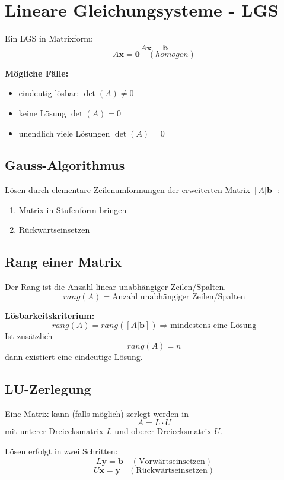 \documentclass[9pt,a4paper]{article}
\begin{document}
    \section{Lineare Gleichungsysteme - LGS}
    
    Ein LGS in Matrixform:
    \[
    A\mathbf{x}=\mathbf{b}
    \]
    \[
    A\mathbf{x}=\mathbf{0} \quad (homogen)
    \]
    
    \textbf{Mögliche Fälle:}
    \begin{itemize}
        \item eindeutig lösbar: $\det(A)\neq 0$
        \item keine Lösung  $\det(A) = 0$
        \item unendlich viele Lösungen  $\det(A)= 0$
    \end{itemize}
    
    \subsection{Gauss-Algorithmus}
    Lösen durch elementare Zeilenumformungen der erweiterten Matrix $[A|\mathbf{b}]$:
    \begin{enumerate}
        \item Matrix in Stufenform bringen
        \item Rückwärtseinsetzen
    \end{enumerate}
    
    \subsection{Rang einer Matrix}
    Der Rang ist die Anzahl linear unabhängiger Zeilen/Spalten.
    \[
    rang(A)=\text{Anzahl unabhängiger Zeilen/Spalten}
    \]
    
    \textbf{Lösbarkeitskriterium:}
    \[
    rang(A)=rang([A|\mathbf{b}]) \Rightarrow \text{mindestens eine Lösung}
    \]
    Ist zusätzlich
    \[
    rang(A)=n
    \]
    dann existiert eine eindeutige Lösung.
    
    \subsection{LU-Zerlegung}
    Eine Matrix kann (falls möglich) zerlegt werden in
    \[
    A = L\cdot U
    \]
    mit unterer Dreiecksmatrix $L$ und oberer Dreiecksmatrix $U$.
    
    Lösen erfolgt in zwei Schritten:
    \[
    L\mathbf{y}=\mathbf{b} \quad (\text{Vorwärtseinsetzen})
    \]
    \[
    U\mathbf{x}=\mathbf{y} \quad (\text{Rückwärtseinsetzen})
    \]
    
\end{document}

